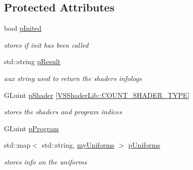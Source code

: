 \subsection*{Protected Attributes}
\begin{DoxyCompactItemize}
\item 
bool \hyperlink{class_v_s_shader_lib_a78735f3968c53215f2ce5a196ef5f7bd}{p\+Inited}
\begin{DoxyCompactList}\small\item\em stores if init has been called \end{DoxyCompactList}\item 
std\+::string \hyperlink{class_v_s_shader_lib_ac8d4786561bfd4110897a2e2ba7feaf2}{p\+Result}
\begin{DoxyCompactList}\small\item\em aux string used to return the shaders infologs \end{DoxyCompactList}\item 
G\+Luint \hyperlink{class_v_s_shader_lib_aa3f9bd5334ab5901209d30d6060bc971}{p\+Shader} \mbox{[}\hyperlink{class_v_s_shader_lib_ae8a4410569faa6d4df9760e998a9706aa112e7924ef9a87ad0d894fe216f84e39}{V\+S\+Shader\+Lib\+::\+C\+O\+U\+N\+T\+\_\+\+S\+H\+A\+D\+E\+R\+\_\+\+T\+Y\+PE}\mbox{]}
\begin{DoxyCompactList}\small\item\em stores the shaders and program indices \end{DoxyCompactList}\item 
G\+Luint \hyperlink{class_v_s_shader_lib_a34bc8659f8480ebb03639ed8f61f2b06}{p\+Program}
\item 
std\+::map$<$ std\+::string, \hyperlink{class_v_s_shader_lib_a3302b287e0686235d57404bd4587c1e6}{my\+Uniforms} $>$ \hyperlink{class_v_s_shader_lib_a24c8f833871e02d217b04bc7305917ea}{p\+Uniforms}
\begin{DoxyCompactList}\small\item\em stores info on the uniforms \end{DoxyCompactList}\end{DoxyCompactItemize}
